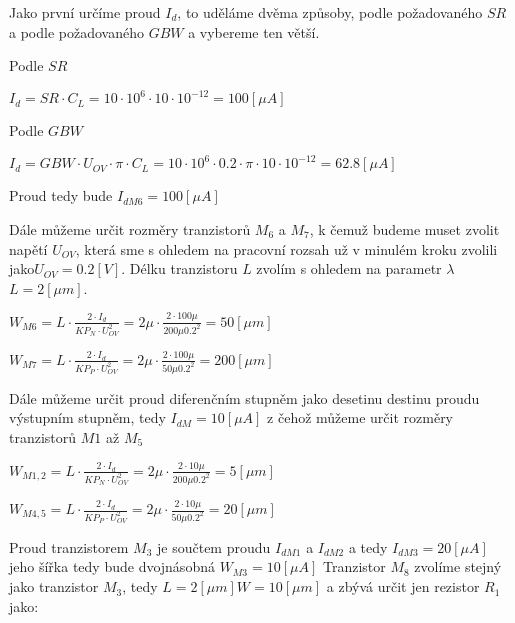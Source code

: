 Jako první určíme proud \(I_d\), to uděláme dvěma způsoby, podle požadovaného \(SR\) a podle požadovaného \(GBW\) a vybereme ten větší.

Podle \(SR\)
\begin{center}
    \large
    \(
        I_d = SR \cdot C_L = 10 \cdot 10^{6} \cdot 10 \cdot 10^{-12} = 100 [\mu A]
    \)
\end{center}

Podle \(GBW\) 
\begin{center}
    \large
    \(
        I_d = GBW \cdot U_{OV} \cdot \pi \cdot C_L = 10 \cdot 10^{6} \cdot 0.2 \cdot \pi \cdot 10\cdot 10^{-12} =  62.8 [\mu A]
    \)
\end{center}

Proud tedy bude \(I_{dM6} = 100 [\mu A]\) 

Dále můžeme určit rozměry tranzistorů \(M_6\) a \(M_7\), k čemuž budeme muset zvolit napětí \(U_{OV}\), která sme s ohledem na pracovní rozsah už v minulém kroku zvolili jako\(U_{OV} = 0.2 [V]\).
Délku tranzistoru \(L\) zvolím s ohledem na parametr \(\lambda\) \(L = 2 [\mu m]\).

\begin{center}
    \large
    \(
        W_{M6} = L \cdot \frac{2 \cdot I_d}{KP_N \cdot U_{OV}^2} = 2\mu \cdot \frac{2 \cdot 100\mu}{200\mu 0.2^2} = 50 [\mu m]
    \)
\end{center}

\begin{center}
    \large
    \(
        W_{M7} = L \cdot \frac{2 \cdot I_d}{KP_P \cdot U_{OV}^2} = 2\mu \cdot \frac{2 \cdot 100\mu}{50\mu 0.2^2} = 200 [\mu m]
    \)
\end{center}

Dále můžeme určit proud diferenčním stupněm jako desetinu destinu proudu výstupním stupněm, tedy \(I_{dM} = 10 [\mu A]\) z čehož můžeme určit rozměry tranzistorů \(M1\) až \(M_5\)

\begin{center}
    \large
    \(
        W_{M1,2} = L \cdot \frac{2 \cdot I_d}{KP_N \cdot U_{OV}^2} = 2\mu \cdot \frac{2 \cdot 10\mu}{200\mu 0.2^2} = 5 [\mu m]
    \)
\end{center}

\begin{center}
    \large
    \(
        W_{M4,5} = L \cdot \frac{2 \cdot I_d}{KP_P \cdot U_{OV}^2} = 2\mu \cdot \frac{2 \cdot 10\mu}{50\mu 0.2^2} = 20 [\mu m]
    \)
\end{center}

Proud tranzistorem \(M_3\) je součtem proudu \(I_{dM1}\) a \(I_{dM2}\) a tedy \(I_{dM3} = 20 [\mu A]\) jeho šířka tedy bude dvojnásobná \(W_{M3} = 10 [\mu A]\)
Tranzistor \(M_8\) zvolíme stejný jako tranzistor \(M_3\), tedy \(L=2 [\mu m] W=10[\mu m]\) a zbývá určit jen rezistor \(R_1\) jako:

